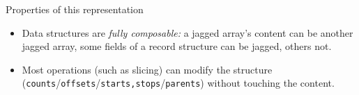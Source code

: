 \documentclass[aspectratio=169]{beamer}
\begin{document}
\begin{frame}{Properties of this representation}
\Large
\vspace{0.5 cm}
\begin{itemize}\setlength{\itemsep}{0.5 cm}
\item<1-> Data structures are {\it fully composable:} a jagged array's content can be another jagged array, some fields of a record structure can be jagged, others not.
\item<2-> Most operations (such as slicing) can modify the structure ({\tt counts}/{\tt offsets}/{\tt starts,stops}/{\tt parents}) without touching the content.

\vspace{0.25 cm}
\end{itemize}
\end{frame}
\end{document}
